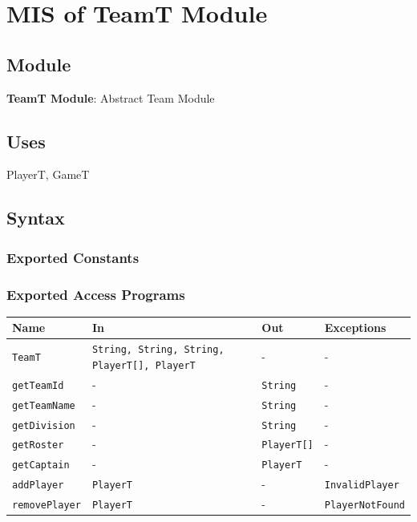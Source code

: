 \documentclass[12pt, titlepage]{article}
\begin{document}
\section{MIS of TeamT Module} \label{TeamModule}

\subsection{Module}
\textbf{TeamT Module}: Abstract Team Module

\subsection{Uses}
PlayerT, GameT

\subsection{Syntax}

\subsubsection{Exported Constants}

\subsubsection{Exported Access Programs}

\begin{center}
  \begin{tabular}{p{4cm} p{4cm} p{4cm} p{3cm}}
    \toprule
    \textbf{Name} & \textbf{In} & \textbf{Out} & \textbf{Exceptions} \\
    \midrule
    \texttt{TeamT}         & \texttt{String, String, String, PlayerT[], PlayerT} & -            & -                   \\
    \texttt{getTeamId}     & -                                                  & \texttt{String}       & -                   \\
    \texttt{getTeamName}   & -                                                  & \texttt{String}       & -                   \\
    \texttt{getDivision}   & -                                                  & \texttt{String}       & -                   \\
    \texttt{getRoster}     & -                                                  & \texttt{PlayerT[]}    & -                   \\
    \texttt{getCaptain}    & -                                                  & \texttt{PlayerT}      & -                   \\
    \texttt{addPlayer}     & \texttt{PlayerT}                                   & -            & \texttt{InvalidPlayer}       \\
    \texttt{removePlayer}  & \texttt{PlayerT}                                   & -            & \texttt{PlayerNotFound}      \\
    \bottomrule
  \end{tabular}
\end{center}
\end{document}

